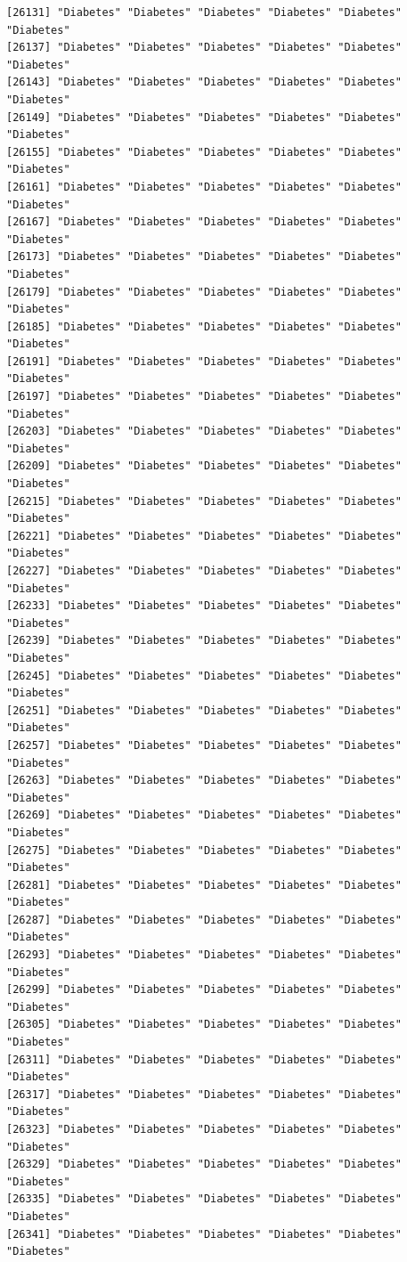 \documentclass[
  letterpaper,
  DIV=11,
  numbers=noendperiod]{scrartcl}
\begin{document}
\begin{verbatim}
[26131] "Diabetes" "Diabetes" "Diabetes" "Diabetes" "Diabetes" "Diabetes"
[26137] "Diabetes" "Diabetes" "Diabetes" "Diabetes" "Diabetes" "Diabetes"
[26143] "Diabetes" "Diabetes" "Diabetes" "Diabetes" "Diabetes" "Diabetes"
[26149] "Diabetes" "Diabetes" "Diabetes" "Diabetes" "Diabetes" "Diabetes"
[26155] "Diabetes" "Diabetes" "Diabetes" "Diabetes" "Diabetes" "Diabetes"
[26161] "Diabetes" "Diabetes" "Diabetes" "Diabetes" "Diabetes" "Diabetes"
[26167] "Diabetes" "Diabetes" "Diabetes" "Diabetes" "Diabetes" "Diabetes"
[26173] "Diabetes" "Diabetes" "Diabetes" "Diabetes" "Diabetes" "Diabetes"
[26179] "Diabetes" "Diabetes" "Diabetes" "Diabetes" "Diabetes" "Diabetes"
[26185] "Diabetes" "Diabetes" "Diabetes" "Diabetes" "Diabetes" "Diabetes"
[26191] "Diabetes" "Diabetes" "Diabetes" "Diabetes" "Diabetes" "Diabetes"
[26197] "Diabetes" "Diabetes" "Diabetes" "Diabetes" "Diabetes" "Diabetes"
[26203] "Diabetes" "Diabetes" "Diabetes" "Diabetes" "Diabetes" "Diabetes"
[26209] "Diabetes" "Diabetes" "Diabetes" "Diabetes" "Diabetes" "Diabetes"
[26215] "Diabetes" "Diabetes" "Diabetes" "Diabetes" "Diabetes" "Diabetes"
[26221] "Diabetes" "Diabetes" "Diabetes" "Diabetes" "Diabetes" "Diabetes"
[26227] "Diabetes" "Diabetes" "Diabetes" "Diabetes" "Diabetes" "Diabetes"
[26233] "Diabetes" "Diabetes" "Diabetes" "Diabetes" "Diabetes" "Diabetes"
[26239] "Diabetes" "Diabetes" "Diabetes" "Diabetes" "Diabetes" "Diabetes"
[26245] "Diabetes" "Diabetes" "Diabetes" "Diabetes" "Diabetes" "Diabetes"
[26251] "Diabetes" "Diabetes" "Diabetes" "Diabetes" "Diabetes" "Diabetes"
[26257] "Diabetes" "Diabetes" "Diabetes" "Diabetes" "Diabetes" "Diabetes"
[26263] "Diabetes" "Diabetes" "Diabetes" "Diabetes" "Diabetes" "Diabetes"
[26269] "Diabetes" "Diabetes" "Diabetes" "Diabetes" "Diabetes" "Diabetes"
[26275] "Diabetes" "Diabetes" "Diabetes" "Diabetes" "Diabetes" "Diabetes"
[26281] "Diabetes" "Diabetes" "Diabetes" "Diabetes" "Diabetes" "Diabetes"
[26287] "Diabetes" "Diabetes" "Diabetes" "Diabetes" "Diabetes" "Diabetes"
[26293] "Diabetes" "Diabetes" "Diabetes" "Diabetes" "Diabetes" "Diabetes"
[26299] "Diabetes" "Diabetes" "Diabetes" "Diabetes" "Diabetes" "Diabetes"
[26305] "Diabetes" "Diabetes" "Diabetes" "Diabetes" "Diabetes" "Diabetes"
[26311] "Diabetes" "Diabetes" "Diabetes" "Diabetes" "Diabetes" "Diabetes"
[26317] "Diabetes" "Diabetes" "Diabetes" "Diabetes" "Diabetes" "Diabetes"
[26323] "Diabetes" "Diabetes" "Diabetes" "Diabetes" "Diabetes" "Diabetes"
[26329] "Diabetes" "Diabetes" "Diabetes" "Diabetes" "Diabetes" "Diabetes"
[26335] "Diabetes" "Diabetes" "Diabetes" "Diabetes" "Diabetes" "Diabetes"
[26341] "Diabetes" "Diabetes" "Diabetes" "Diabetes" "Diabetes" "Diabetes"

\end{verbatim}
\end{document}
